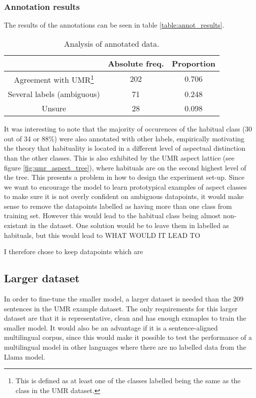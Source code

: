\subsubsection{Annotation results}

The results of the annotations can be seen in table \ref{table:annot_results}.

\begin{table}
    \centering
    \begin{tabular}{|c|c|c|}\hline
         & Absolute freq. & Proportion  \\ \hline
        Agreement with UMR\footnote{This is defined as at least one of the classes labelled being the same as the class in the UMR dataset.} & 202 & 0.706\\ \hline
        Several labels (ambiguous) & 71 & 0.248 \\\hline
        Unsure & 28 & 0.098 \\\hline
    \end{tabular}
    \caption{Analysis of annotated data.}
\end{table}
\label{table:annot_results}

It was interesting to note that the majority of occurences of the habitual class (30 out of 34 or 88\%) were also annotated with other labels, empirically motivating the theory that habituality is located in a different level of aspectual distinction than the other classes. This is also exhibited by the UMR aspect lattice (see figure \ref{fig:umr_aspect_tree}), where habituals are on the second highest level of the tree. This presents a problem in how to design the experiment set-up. Since we want to encourage the model to learn prototypical examples of aspect classes to make sure it is not overly confident on ambiguous datapoints, it would make sense to remove the datapoints labelled as having more than one class from training set. However this would lead to the habitual class being almost non-existant in the dataset. One solution would be to leave them in labelled as habituals, but this would lead to WHAT WOULD IT LEAD TO

I therefore chose to keep datapoints which are 

\subsection{Larger dataset}
In order to fine-tune the smaller model, a larger dataset is needed than the 209 sentences in the UMR example dataset. The only requirements for this larger dataset are that it is representative, clean and has enough exmaples to train the smaller model. It would also be an advantage if it is a sentence-aligned multilingual corpus, since this would make it possible to test the performance of a multilingual model in other languages where there are no labelled data from the Llama model. 




